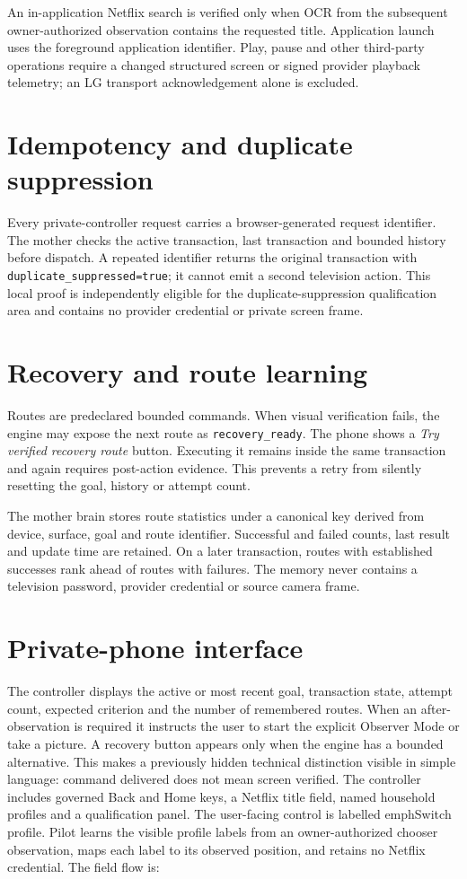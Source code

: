 \documentclass[11pt,a4paper]{article}
\begin{document}
An in-application Netflix search is verified only when OCR from the subsequent
owner-authorized observation contains the requested title.  Application launch
uses the foreground application identifier.  Play, pause and other third-party
operations require a changed structured screen or signed provider playback
telemetry; an LG transport acknowledgement alone is excluded.

\section{Idempotency and duplicate suppression}

Every private-controller request carries a browser-generated request identifier.
The mother checks the active transaction, last transaction and bounded history
before dispatch.  A repeated identifier returns the original transaction with
\nolinkurl{duplicate_suppressed=true}; it cannot emit a second television action.
This local proof is independently eligible for the duplicate-suppression
qualification area and contains no provider credential or private screen frame.

\section{Recovery and route learning}

Routes are predeclared bounded commands.  When visual verification fails, the
engine may expose the next route as \texttt{recovery\_ready}.  The phone shows a
\emph{Try verified recovery route} button.  Executing it remains inside the same
transaction and again requires post-action evidence.  This prevents a retry from
silently resetting the goal, history or attempt count.

The mother brain stores route statistics under a canonical key derived from
device, surface, goal and route identifier.  Successful and failed counts,
last result and update time are retained.  On a later transaction, routes with
established successes rank ahead of routes with failures.  The memory never
contains a television password, provider credential or source camera frame.

\section{Private-phone interface}

The controller displays the active or most recent goal, transaction state,
attempt count, expected criterion and the number of remembered routes.  When an
after-observation is required it instructs the user to start the explicit
Observer Mode or take a picture.  A recovery button appears only when the engine
has a bounded alternative.  This makes a previously hidden technical distinction
visible in simple language: command delivered does not mean screen verified.
The controller includes governed Back and Home keys, a Netflix title field,
named household profiles and a qualification panel.  The user-facing control is
labelled emph{Switch profile}. Pilot learns the visible profile labels from an
owner-authorized chooser observation, maps each label to its observed position,
and retains no Netflix credential. The field flow is:
\end{document}
